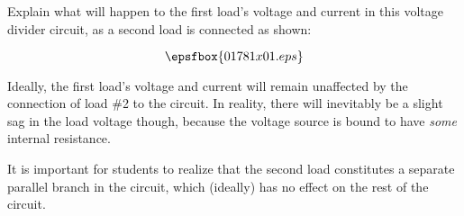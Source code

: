 

Explain what will happen to the first load's voltage and current in this voltage divider circuit, as a second load is connected as shown:

$$\epsfbox{01781x01.eps}$$







Ideally, the first load's voltage and current will remain unaffected by the connection of load \#2 to the circuit.  In reality, there will inevitably be a slight sag in the load voltage though, because the voltage source is bound to have {\it some} internal resistance.







It is important for students to realize that the second load constitutes a separate parallel branch in the circuit, which (ideally) has no effect on the rest of the circuit.




